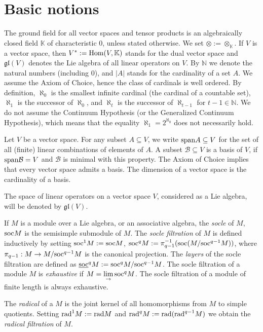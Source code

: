 \documentclass[12pt]{article}
\def\KK {{\mathbb K}}     %
\def\NN {{\mathbb N}}     %
\def\B  {\mathcal B}
\def\mk {\mathfrak}
\def\ul  {\underline}
\begin{document}
\section{Basic notions}

The ground field for all vector spaces and tensor products is an algebraically closed field $\KK$ of characteristic $0$, unless stated otherwise. We set $\otimes:=\otimes_\KK$. If $V$ is a vector space, then $V^*:={\rm Hom}(V,\KK)$ stands for the dual vector space and $\mk{gl}(V)$ denotes the Lie algebra of all linear operators on $V$. By $\NN$ we denote the natural numbers (including $0$), and $|A|$ stands for the cardinality of a set $A$. We assume the Axiom of Choice, hence the class of cardinals is well ordered. By definition, $\aleph_0$ is the smallest infinite cardinal (the cardinal of a countable set), $\aleph_1$ is the successor of $\aleph_0$, and $\aleph_t$ is the successor of $\aleph_{t-1}$ for $t-1\in\NN$. We do not assume the Continuum Hypothesis (or the Generalized Continuum Hypothesis), which means that the equality $\aleph_1=2^{\aleph_0}$ does not necessarily hold. 

Let $V$ be a vector space. For any subset $A\subseteq V$, we write ${\rm span}A\subseteq V$ for the set of all (finite) linear combinations of elements of $A$. A subset $\B\subseteq V$ is a basis of $V$, if ${\rm span}\B=V$ and $\B$ is minimal with this property. The Axiom of Choice implies that every vector space admits a basis. The dimension of a vector space is the cardinality of a basis.

The space of linear operators on a vector space $V$, considered as a Lie algebra, will be denoted by $\mk{gl}(V)$.

If $M$ is a module over a Lie algebra, or an associative algebra, the {\it socle} of $M$, ${\rm soc}M$ is the semisimple submodule of $M$. The {\it socle filtration} of $M$ is defined inductively by setting ${\rm soc}^1M:={\rm soc}M$, ${\rm soc}^qM:=\pi_{q-1}^{-1}({\rm soc}(M/{\rm soc}^{q-1}M))$, where $\pi_{q-1}:M\to M/{\rm soc}^{q-1}M$ is the canonical projection. The {\it layers} of the socle filtration are defined as $\ul{\rm soc}^qM:={\rm soc}^qM/{\rm soc}^{q-1}M$. The socle filtration of a module $M$ is {\it exhaustive} if $M=\lim\limits_\to {\rm soc}^qM$. The socle filtration of a module of finite length is always exhaustive.

The {\it radical} of a $M$ is the joint kernel of all homomorphisms from $M$ to simple quotients. Setting ${\rm rad}^1M:={\rm rad}M$ and ${\rm rad}^qM:={\rm rad}({\rm rad}^{q-1}M)$ we obtain the {\it radical filtration} of $M$.
\end{document}
